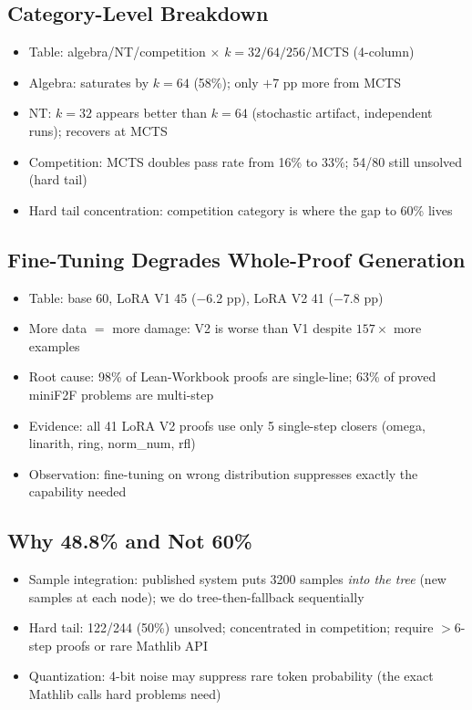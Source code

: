 \documentclass[openany, amssymb, psamsfonts]{amsart}
\begin{document}
\subsection{Category-Level Breakdown}
\begin{itemize}
  \item Table: algebra/NT/competition $\times$ $k=32/64/256$/MCTS (4-column)
  \item Algebra: saturates by $k=64$ (58\%); only $+$7 pp more from MCTS
  \item NT: $k=32$ appears better than $k=64$ (stochastic artifact, independent runs); recovers at MCTS
  \item Competition: MCTS doubles pass rate from 16\% to 33\%; 54/80 still unsolved (hard tail)
  \item Hard tail concentration: competition category is where the gap to 60\% lives
\end{itemize}

\subsection{Fine-Tuning Degrades Whole-Proof Generation}
\begin{itemize}
  \item Table: base 60, LoRA V1 45 ($-$6.2 pp), LoRA V2 41 ($-$7.8 pp)
  \item More data $=$ more damage: V2 is worse than V1 despite $157\times$ more examples
  \item Root cause: 98\% of Lean-Workbook proofs are single-line; 63\% of proved miniF2F problems are multi-step
  \item Evidence: all 41 LoRA V2 proofs use only 5 single-step closers (omega, linarith, ring, norm\_num, rfl)
  \item Observation: fine-tuning on wrong distribution suppresses exactly the capability needed
\end{itemize}

\subsection{Why 48.8\% and Not 60\%}
\begin{itemize}
  \item Sample integration: published system puts 3200 samples \emph{into the tree} (new samples at each node); we do tree-then-fallback sequentially
  \item Hard tail: 122/244 (50\%) unsolved; concentrated in competition; require $>$6-step proofs or rare Mathlib API
  \item Quantization: 4-bit noise may suppress rare token probability (the exact Mathlib calls hard problems need)
\end{itemize}
\end{document}
